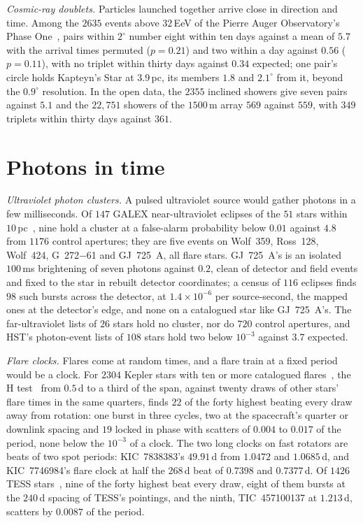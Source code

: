 \documentclass[3p,11pt]{elsarticle}
\begin{document}
\emph{Cosmic-ray doublets.} Particles launched together arrive close in direction and
time. Among the $2635$ events above $32$\,EeV of the Pierre Auger Observatory's Phase
One~\cite{Auger2022}, pairs within $2^\circ$ number eight within ten days against a mean of
$5.7$ with the arrival times permuted ($p=0.21$) and two within a day against $0.56$
($p=0.11$), with no triplet within thirty days against $0.34$ expected; one pair's circle
holds Kapteyn's Star at $3.9$\,pc, its members $1.8$ and $2.1^\circ$ from it, beyond the
$0.9^\circ$ resolution. In the open data, the $2355$ inclined showers give seven pairs
against $5.1$ and the $22{,}751$ showers of the $1500$\,m array $569$ against $559$, with
$349$ triplets within thirty days against $361$.

\section{Photons in time}\label{sec:timing}

\emph{Ultraviolet photon clusters.} A pulsed ultraviolet source would gather photons in a
few milliseconds. Of $147$ GALEX near-ultraviolet eclipses of the $51$ stars within
$10$\,pc~\cite{Martin2005,Million2016}, nine hold a cluster at a false-alarm probability
below $0.01$ against $4.8$ from $1176$ control apertures; they are five events on Wolf~359,
Ross~128, Wolf~424, G~272$-$61 and GJ~725~A, all flare stars. GJ~725~A's is an isolated
$100$\,ms brightening of seven photons against $0.2$, clean of detector and field events and
fixed to the star in rebuilt detector coordinates; a census of $116$ eclipses finds $98$
such bursts across the detector, at $1.4\times10^{-6}$ per source-second, the mapped ones at
the detector's edge, and none on a catalogued star like GJ~725~A's. The far-ultraviolet
lists of $26$ stars hold no cluster, nor do $720$ control apertures, and HST's
photon-event lists of $108$ stars hold two below $10^{-3}$ against $3.7$ expected.

\emph{Flare clocks.} Flares come at random times, and a flare train at a fixed period
would be a clock. For $2304$ Kepler stars with ten or more catalogued
flares~\cite{YangLiu2019}, the H test~\cite{deJager2010} from $0.5$\,d to a third of the
span, against twenty draws of other stars' flare times in the same quarters, finds $22$
of the forty highest beating every draw away from rotation: one burst in three cycles,
two at the spacecraft's quarter or downlink spacing and $19$ locked in phase with
scatters of $0.004$ to $0.017$ of the period, none below the $10^{-3}$ of a clock. The two
long clocks on fast rotators are beats of two spot periods: KIC~7838383's $49.91$\,d from
$1.0472$ and $1.0685$\,d, and KIC~7746984's flare clock at half the $268$\,d beat of
$0.7398$ and $0.7377$\,d. Of $1426$ TESS stars~\cite{Yang2023}, nine of the forty highest beat
every draw, eight of them bursts at the $240$\,d spacing of TESS's pointings, and the
ninth, TIC~457100137 at $1.213$\,d, scatters by $0.0087$ of the period.
\end{document}
